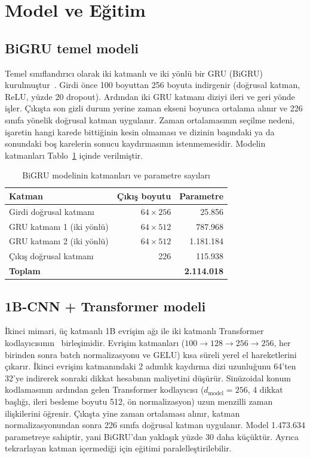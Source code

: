 \section{Model ve Eğitim}
\label{CH:Model}

\subsection{BiGRU temel modeli}

Temel sınıflandırıcı olarak iki katmanlı ve iki yönlü bir GRU (BiGRU) kurulmuştur~\cite{Cho2014}.
Girdi önce 100 boyuttan 256 boyuta indirgenir (doğrusal katman, ReLU, yüzde 20
dropout). Ardından iki GRU katmanı diziyi ileri ve geri yönde işler. Çıkışta son gizli
durum yerine zaman ekseni boyunca ortalama alınır ve 226 sınıfa yönelik doğrusal katman
uygulanır. Zaman ortalamasının seçilme nedeni, işaretin hangi karede bittiğinin kesin
olmaması ve dizinin başındaki ya da sonundaki boş karelerin sonucu kaydırmasının
istenmemesidir. Modelin katmanları Tablo~\ref{tab:gru} içinde verilmiştir.

\begin{table}[H]
\centering
\caption{BiGRU modelinin katmanları ve parametre sayıları}
\label{tab:gru}
\begin{tabular}{lrr}
\toprule
\textbf{Katman} & \textbf{Çıkış boyutu} & \textbf{Parametre} \\
\midrule
Girdi doğrusal katmanı & $64\times256$ & 25.856 \\
GRU katmanı 1 (iki yönlü) & $64\times512$ & 787.968 \\
GRU katmanı 2 (iki yönlü) & $64\times512$ & 1.181.184 \\
Çıkış doğrusal katmanı & 226 & 115.938 \\
\midrule
\textbf{Toplam} & & \textbf{2.114.018} \\
\bottomrule
\end{tabular}
\end{table}

\subsection{1B-CNN + Transformer modeli}

İkinci mimari, üç katmanlı 1B evrişim ağı ile iki katmanlı Transformer
kodlayıcısının~\cite{Vaswani2017} birleşimidir. Evrişim katmanları
($100\rightarrow128\rightarrow256\rightarrow256$, her birinden sonra batch
normalizasyonu ve GELU) kısa süreli yerel el hareketlerini çıkarır. İkinci evrişim
katmanındaki 2 adımlık kaydırma dizi uzunluğunu 64'ten 32'ye indirerek sonraki dikkat
hesabının maliyetini düşürür. Sinüzoidal konum kodlamasının ardından gelen Transformer
kodlayıcısı ($d_{\text{model}}=256$, 4 dikkat başlığı, ileri besleme boyutu 512, ön
normalizasyon) uzun menzilli zaman ilişkilerini öğrenir. Çıkışta yine zaman ortalaması
alınır, katman normalizasyonundan sonra 226 sınıfa doğrusal katman uygulanır. Model
1.473.634 parametreye sahiptir, yani BiGRU'dan yaklaşık yüzde 30 daha küçüktür. Ayrıca
tekrarlayan katman içermediği için eğitimi paralelleştirilebilir.


